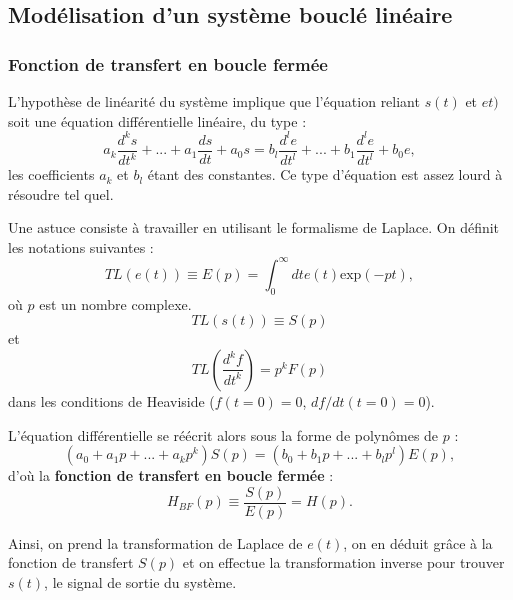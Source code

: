 \documentclass[11pt,a4paper]{report}
\begin{document}
\subsection{Modélisation d'un système bouclé linéaire}

\subsubsection{Fonction de transfert en boucle fermée}

L'hypothèse de linéarité du système implique que l'équation reliant $s(t)$ et $et)$ soit une équation différentielle linéaire, du type :
\begin{equation}
	a_k  \frac{d^ks}{dt^k}   + ... + a_1 \frac{ds}{dt} + a_0 s = b_l \frac{d^l e}{dt^l} + ... + b_1 \frac{d^l e}{dt^l} + b_0 e, 
\end{equation}
les coefficients $a_k$ et $b_l$ étant des constantes. Ce type d'équation est assez lourd à résoudre tel quel.

Une astuce consiste à travailler en utilisant le formalisme de Laplace. On définit les notations suivantes :
\begin{equation}
 TL(e(t)) \equiv E(p) = \int_0^{\infty} dt e(t) \text{exp}\left(-pt\right),
\end{equation}
où $p$ est un nombre complexe.
\begin{equation}
TL(s(t)) \equiv S(p)
\end{equation}
et 
\begin{equation}
TL\left(\frac{d^k f}{dt^k}\right) = p^k F(p)
\end{equation}
dans les conditions de Heaviside ($f(t = 0) = 0$, $df/dt (t=0) = 0$).

L'équation différentielle se réécrit alors sous la forme de polynômes de $p$ :
\begin{equation}
	\left(a_0 + a_1 p + ... + a_k p^k \right) S(p) = \left(b_0 + b_1 p + ... + b_l p^l \right) E(p),
\end{equation}
d'où la \textbf{fonction de transfert en boucle fermée} :
\begin{equation}
	 \boxed{H_{BF}(p) \equiv \frac{S(p)}{E(p)} = H(p)}.
\end{equation}

Ainsi, on prend la transformation de Laplace de $e(t)$, on en déduit grâce à la fonction de transfert $S(p)$ et on effectue la transformation inverse pour trouver $s(t)$, le signal de sortie du système.\\
\end{document}
